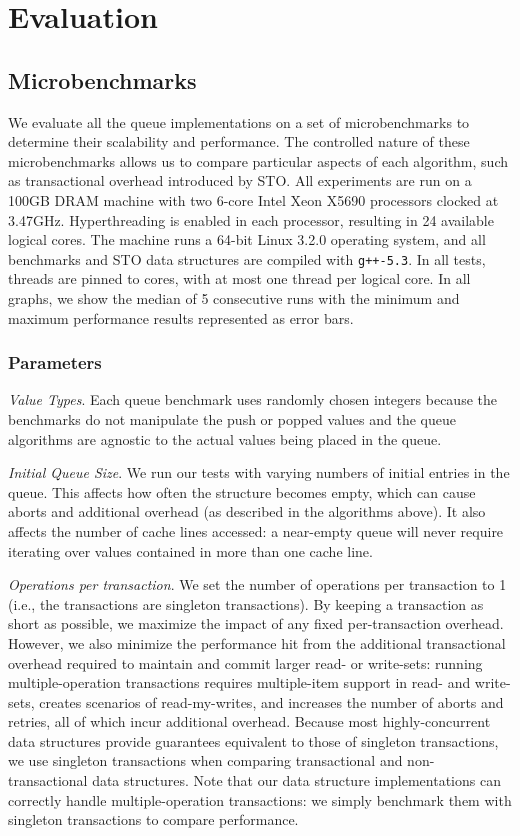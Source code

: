 \section{Evaluation}

\subsection{Microbenchmarks}
\label{q_microbenchmarks}

We evaluate all the queue implementations on a set of microbenchmarks to determine their scalability and performance. The controlled nature of these microbenchmarks allows us to compare particular aspects of each algorithm, such as transactional overhead introduced by STO. All experiments are run on a 100GB DRAM machine with two 6-core Intel Xeon X5690 processors clocked at 3.47GHz. Hyperthreading is enabled in each processor, resulting in 24 available logical cores. The machine runs a 64-bit Linux 3.2.0 operating system, and all benchmarks and STO data structures are compiled with \texttt{g++-5.3}. In all tests, threads are pinned to cores, with at most one thread per logical core.
In all graphs, we show the median of 5 consecutive runs with the minimum and maximum performance results represented as error bars.

\subsubsection{Parameters}

\emph{Value Types}. Each queue benchmark uses randomly chosen integers because the benchmarks do not manipulate the push or popped values and the queue algorithms are agnostic to the actual values being placed in the queue.

\emph{Initial Queue Size}. We run our tests with varying numbers of initial entries in the queue. This affects how often the structure becomes empty, which can cause aborts and additional overhead (as described in the algorithms above). It also affects the number of cache lines accessed: a near-empty queue will never require iterating over values contained in more than one cache line.

\emph{Operations per transaction}. We set the number of operations per transaction to 1 (i.e., the transactions are singleton transactions). By keeping a transaction as short as possible, we maximize the impact of any fixed per-transaction overhead. However, we also minimize the performance hit from the additional transactional overhead required to maintain and commit larger read- or write-sets: running multiple-operation transactions requires multiple-item support in read- and write-sets, creates scenarios of read-my-writes, and increases the number of aborts and retries, all of which incur additional overhead. 
Because most highly-concurrent data structures provide guarantees equivalent to those of singleton transactions, we use singleton transactions when comparing transactional and non-transactional data structures.
Note that our data structure implementations can correctly handle multiple-operation transactions: we simply benchmark them with singleton transactions to compare performance.

